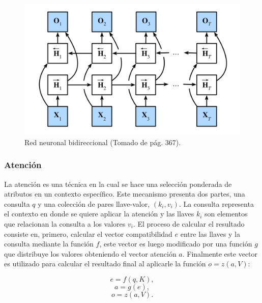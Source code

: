 \begin{figure}[h!]
	\begin{center}
		\begin{center}
			\includegraphics[scale=.3]{Graphics/rnn_bidirectional.png}
        \end{center}
	    \caption{Red neuronal bidireccional (Tomado de \textcite{d2l} pág. 367).}\label{fig:rnn_bidirectional}
	\end{center}
\end{figure}


\subsubsection{Atención}

La atención es una técnica en la cual se hace una selección ponderada de atributos en un contexto específico. 
Este mecanismo presenta dos partes, una consulta $q$ y una colección de pares llave-valor, $(k_i, v_i)$. La 
consulta representa el contexto en donde se quiere aplicar la atención y las llaves $k_i$ son elementos que 
relacionan la consulta a los valores $v_i$. El proceso de calcular el resultado consiste en, primero, calcular 
el vector compatibilidad $e$ entre las llaves y la consulta mediante la función $f$, este vector es luego 
modificado por una función $g$ que distribuye los valores obteniendo el vector atención $a$. Finalmente 
este vector es utilizado para calcular el resultado final al aplicarle la función $o = z(a, V)$:

\begin{equation}
	e = f(q, K),
\end{equation}
\begin{equation}
	a = g(e),
\end{equation}
\begin{equation}
	o = z(a, V).
\end{equation}

